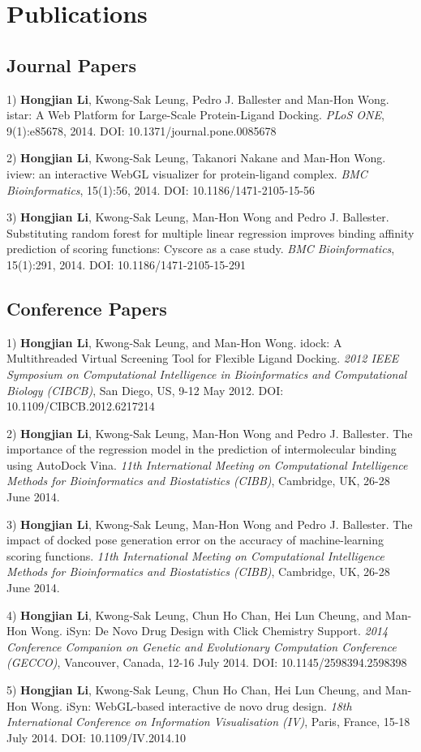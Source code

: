 \chapter{Publications}

\section{Journal Papers}

1) \textbf{Hongjian Li}, Kwong-Sak Leung, Pedro J. Ballester and Man-Hon Wong. istar: A Web Platform for Large-Scale Protein-Ligand Docking. \textit{PLoS ONE}, 9(1):e85678, 2014. DOI: 10.1371/journal.pone.0085678

2) \textbf{Hongjian Li}, Kwong-Sak Leung, Takanori Nakane and Man-Hon Wong. iview: an interactive WebGL visualizer for protein-ligand complex. \textit{BMC Bioinformatics}, 15(1):56, 2014. DOI: 10.1186/1471-2105-15-56

3) \textbf{Hongjian Li}, Kwong-Sak Leung, Man-Hon Wong and Pedro J. Ballester. Substituting random forest for multiple linear regression improves binding affinity prediction of scoring functions: Cyscore as a case study. \textit{BMC Bioinformatics}, 15(1):291, 2014. DOI: 10.1186/1471-2105-15-291

\section{Conference Papers}

1) \textbf{Hongjian Li}, Kwong-Sak Leung, and Man-Hon Wong. idock: A Multithreaded Virtual Screening Tool for Flexible Ligand Docking. \textit{2012 IEEE Symposium on Computational Intelligence in Bioinformatics and Computational Biology (CIBCB)}, San Diego, US, 9-12 May 2012. DOI: 10.1109/CIBCB.2012.6217214

2) \textbf{Hongjian Li}, Kwong-Sak Leung, Man-Hon Wong and Pedro J. Ballester. The importance of the regression model in the prediction of intermolecular binding using AutoDock Vina. \textit{11th International Meeting on Computational Intelligence Methods for Bioinformatics and Biostatistics (CIBB)}, Cambridge, UK, 26-28 June 2014.

3) \textbf{Hongjian Li}, Kwong-Sak Leung, Man-Hon Wong and Pedro J. Ballester. The impact of docked pose generation error on the accuracy of machine-learning scoring functions. \textit{11th International Meeting on Computational Intelligence Methods for Bioinformatics and Biostatistics (CIBB)}, Cambridge, UK, 26-28 June 2014.

4) \textbf{Hongjian Li}, Kwong-Sak Leung, Chun Ho Chan, Hei Lun Cheung, and Man-Hon Wong. iSyn: De Novo Drug Design with Click Chemistry Support. \textit{2014 Conference Companion on Genetic and Evolutionary Computation Conference (GECCO)}, Vancouver, Canada, 12-16 July 2014. DOI: 10.1145/2598394.2598398

5) \textbf{Hongjian Li}, Kwong-Sak Leung, Chun Ho Chan, Hei Lun Cheung, and Man-Hon Wong. iSyn: WebGL-based interactive de novo drug design. \textit{18th International Conference on Information Visualisation (IV)}, Paris, France, 15-18 July 2014. DOI: 10.1109/IV.2014.10

\chapterend
